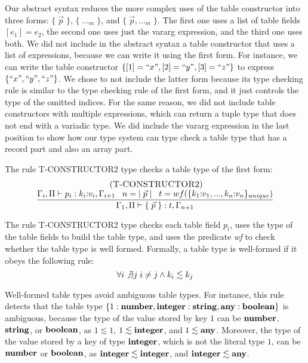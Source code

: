 Our abstract syntax reduces the more complex uses of the table
constructor into three forms: $\{\;\vec{p}\;\}$, $\{\;{...}_{m}\;\}$,
and $\{\;\vec{p},{...}_{m}\;\}$.
The first one uses a list of table fields $[e_{1}] = e_{2}$,
the second one uses just the vararg expression, and the third one uses both.
We did not include in the abstract syntax a table constructor
that uses a list of expressions, because we can write it using the first form.
For instance, we can write the table constructor
$\{ [1] = ``x", [2] = ``y", [3] = ``z" \}$ to express $\{ ``x", ``y", ``z" \}$.
We chose to not include the latter form because its type checking rule is similar
to the type checking rule of the first form, and it just controls the type of
the omitted indices.
For the same reason, we did not include table constructors with
multiple expressions, which can return a tuple type that does not end
with a variadic type.
We did include the vararg expression in the last position to show how
our type system can type check a table type that has a record part and
also an array part.

The rule \textsc{T-CONSTRUCTOR2} type checks a table type of the first form:
\[
\begin{array}{c}
\; (\textsc{T-CONSTRUCTOR2})\\
\dfrac{\Gamma_{i}, \Pi \vdash p_{i}:k_{i}{:}v_{i}, \Gamma_{i+1} \;\;\;
       n = |\;\vec{p}\;| \;\;\;
       t = wf(\{k_{1}{:}v_{1}, ..., k_{n}{:}v_{n}\}_{unique})}
      {\Gamma_{1}, \Pi \vdash \{\;\vec{p}\;\}:t, \Gamma_{n+1}}
\end{array}
\]

The rule \textsc{T-CONSTRUCTOR2} type checks each table field $p_{i}$,
uses the type of the table fields to build the table type, and
uses the predicate \emph{wf} to check whether the table type is
well formed.
Formally, a table type is well-formed if it obeys the following rule:
\[
\forall i \not\exists j \; i \not= j \wedge k_{i} \lesssim k_{j}
\]

Well-formed table types avoid ambiguous table types.
For instance, this rule detects that the table type
$\{1:\mathbf{number}, \mathbf{integer}:\mathbf{string}, \mathbf{any}:\mathbf{boolean}\}$ is ambiguous,
because the type of the value stored by key $1$ can be
$\mathbf{number}$, $\mathbf{string}$, or $\mathbf{boolean}$, as $1 \lesssim 1$,
$1 \lesssim \mathbf{integer}$, and $1 \lesssim \mathbf{any}$.
Moreover, the type of the value stored by a key of type $\mathbf{integer}$,
which is not the literal type $1$, can be $\mathbf{number}$ or $\mathbf{boolean}$,
as $\mathbf{integer} \lesssim \mathbf{integer}$, and $\mathbf{integer} \lesssim \mathbf{any}$.

